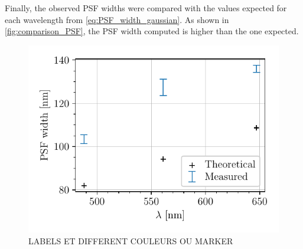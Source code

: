 Finally, the observed PSF widths were compared with the values expected for each wavelength from \autoref{eq:PSF_width_gaussian}.
As shown in \autoref{fig:comparison_PSF}, the PSF width computed is higher than the one expected.

\begin{figure}[htbp]
    \centering
    \includegraphics[scale=1]{figures/comparison_PSF.pdf}
    \caption{LABELS ET DIFFERENT COULEURS OU MARKER}
    \label{fig:comparison_PSF}
\end{figure}

